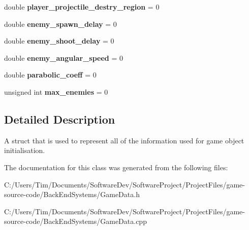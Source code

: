 \begin{DoxyCompactItemize}
\item 
\mbox{\label{struct_game_object_data_a6a48de920f85ec56618b60aae531a583}} 
double {\bfseries player\+\_\+projectile\+\_\+destry\+\_\+region} = 0
\item 
\mbox{\label{struct_game_object_data_a71ac523abe4fdfb74d3661b84a5cbb0b}} 
double {\bfseries enemy\+\_\+spawn\+\_\+delay} = 0
\item 
\mbox{\label{struct_game_object_data_a8501415af53900b1d98ae73e836e4abd}} 
double {\bfseries enemy\+\_\+shoot\+\_\+delay} = 0
\item 
\mbox{\label{struct_game_object_data_a253e5f337879b88a89dfbf2874d5e655}} 
double {\bfseries enemy\+\_\+angular\+\_\+speed} = 0
\item 
\mbox{\label{struct_game_object_data_a8787302d15d2bf0d6b3818460ec8d7a3}} 
double {\bfseries parabolic\+\_\+coeff} = 0
\item 
\mbox{\label{struct_game_object_data_a4b27cd49cdc78b3d977d81e8c88f2c1e}} 
unsigned int {\bfseries max\+\_\+enemies} = 0
\end{DoxyCompactItemize}


\subsection{Detailed Description}
A struct that is used to represent all of the information used for game object initialisation. 

The documentation for this class was generated from the following files\+:\begin{DoxyCompactItemize}
\item 
C\+:/\+Users/\+Tim/\+Documents/\+Software\+Dev/\+Software\+Project/\+Project\+Files/game-\/source-\/code/\+Back\+End\+Systems/Game\+Data.\+h\item 
C\+:/\+Users/\+Tim/\+Documents/\+Software\+Dev/\+Software\+Project/\+Project\+Files/game-\/source-\/code/\+Back\+End\+Systems/Game\+Data.\+cpp\end{DoxyCompactItemize}
